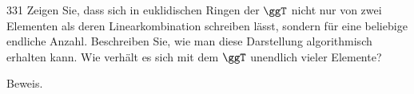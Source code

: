 \begin{algebraUE}{331}
Zeigen Sie, dass sich in euklidischen Ringen der $\ggT$ nicht nur von zwei
Elementen als deren Linearkombination schreiben lässt, sondern für eine
beliebige endliche Anzahl. Beschreiben Sie, wie man diese Darstellung
algorithmisch erhalten kann. Wie verhält es sich mit dem $\ggT$ unendlich
vieler Elemente?
\end{algebraUE}
\begin{solution}
Beweis.
\end{solution}
